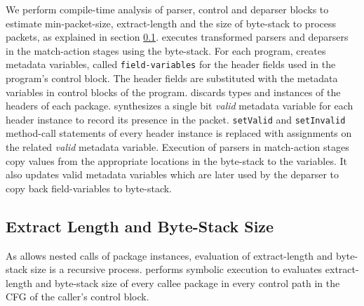 \documentclass[letterpaper,twocolumn,10pt]{article}
\begin{document}
We perform compile-time analysis of parser, control and deparser blocks to estimate min-packet-size, extract-length and the size of byte-stack to process packets, as explained in section \ref{subsection:extract-length-and-byte-stack-size}. 
\ucomp executes transformed parsers and deparsers in the match-action stages using the byte-stack.
For each program, \ucomp creates metadata variables, called \texttt{field-variables} for the header fields used in the program's control block.
The header fields are substituted with the metadata variables in control blocks of the program.
\ucomp discards types and instances of the headers of each package.
\ucomp synthesizes a single bit \emph{valid} metadata variable for each header instance to record its presence in the packet.
\texttt{setValid} and \texttt{setInvalid} method-call statements of every header instance is replaced with assignments on the related \emph{valid} metadata variable.
Execution of parsers in match-action stages copy values from the appropriate locations in the byte-stack to the variables.
It also updates valid metadata variables which are later used by the deparser to copy back field-variables to byte-stack.




\subsection{Extract Length and Byte-Stack Size}
\label{subsection:extract-length-and-byte-stack-size}
As \ulang allows nested calls of package instances, evaluation of extract-length and byte-stack size is a recursive process.
\ucomp performs symbolic execution to evaluates extract-length and byte-stack size of every callee package in every control path in the CFG of the caller's control block.
\end{document}
